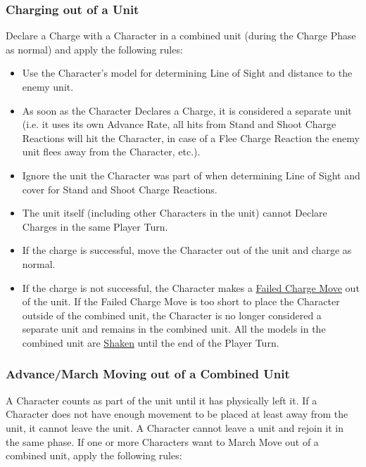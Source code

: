 \subsubsection{Charging out of a Unit}

Declare a Charge with a Character in a combined unit (during the Charge Phase as normal) and apply the following rules:

\begin{itemize}[label={-}]
\item Use the Character's model for determining Line of Sight and distance to the enemy unit.
\item As soon as the Character Declares a Charge, it is considered a separate unit (i.e. it uses its own Advance Rate, all hits from Stand and Shoot Charge Reactions will hit the Character, in case of a Flee Charge Reaction the enemy unit flees away from the Character, etc.).
\item Ignore the unit the Character was part of when determining Line of Sight and cover for Stand and Shoot Charge Reactions.
\item The unit itself (including other Characters in the unit) cannot Declare Charges in the same Player Turn.
\item If the charge is successful, move the Character out of the unit and charge as normal.
\item If the charge is not successful, the Character makes a \hyperref[failed_charge]{Failed Charge Move} out of the unit. If the Failed Charge Move is too short to place the Character outside  of the combined unit, the Character is no longer considered a separate unit and remains in the combined unit. All the models in the combined unit are \hyperref[shaken]{Shaken} until the end of the Player Turn.
\end{itemize}



\subsubsection{Advance/March Moving out of a Combined Unit}

A Character counts as part of the unit until it has physically left it. If a Character does not have enough movement to be placed at least  away from the unit, it cannot leave the unit. A Character cannot leave a unit and rejoin it in the same phase. If one or more Characters want to March Move out of a combined unit, apply the following rules:

